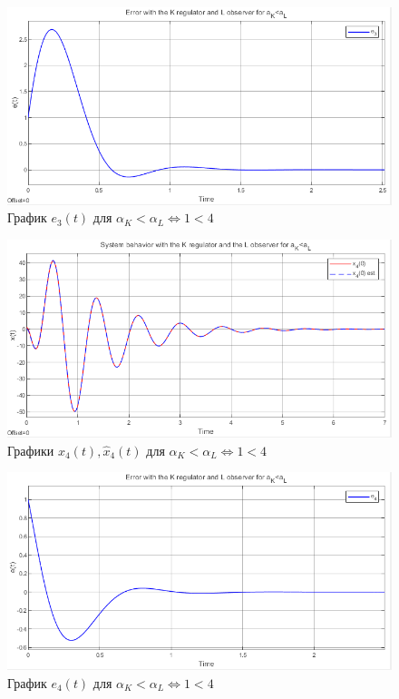 \documentclass[a4paper, 12pt]{article}
\begin{document}
    \begin{figure}[H]
        \centering
        \includegraphics[scale=0.8]{2task_aKlaL_e3.png}
        \captionsetup{skip=0pt}
        \caption{График $e_3(t)$ для $\alpha_K<\alpha_L\Leftrightarrow1<4$}
        \label{2task_aKlaL_e3}
    \end{figure}
    \newpage
    \vspace*{20mm}
    \begin{figure}[H]
        \centering
        \includegraphics[scale=0.8]{2task_aKlaL_x4.png}
        \captionsetup{skip=0pt}
        \caption{Графики $x_4(t),\hat{x}_4(t)$ для $\alpha_K<\alpha_L\Leftrightarrow1<4$}
        \label{2task_aKlaL_x4}
    \end{figure}
    \begin{figure}[H]
        \centering
        \includegraphics[scale=0.8]{2task_aKlaL_e4.png}
        \captionsetup{skip=0pt}
        \caption{График $e_4(t)$ для $\alpha_K<\alpha_L\Leftrightarrow1<4$}
        \label{2task_aKlaL_e4}
    \end{figure}
\end{document}
